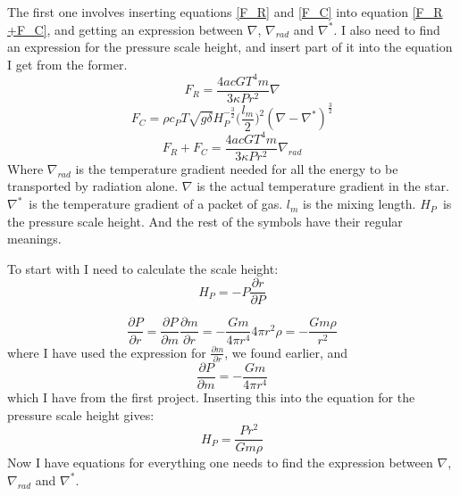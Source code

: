 \documentclass[a4paper,12pt]{article}
\begin{document}
The first one involves inserting equations \ref{F_R} and \ref{F_C} into equation \ref{F_R +F_C}, and getting an expression between $\nabla$, $\nabla_{rad}$ and $\nabla^*$. 
I also need to find an expression for the pressure scale height, and insert part of it into the equation I get from the former.
\begin{equation}
F_R = \frac{4acGT^4 m}{3\kappa Pr^2}\nabla
\label{F_R}
\end{equation}
\begin{equation}
 F_C = \rho c_P T \sqrt{g\delta}H_P^{-\frac{3}{2}}\bigg(\frac{l_m}{2}\bigg)^2(\nabla - \nabla^*)^{\frac{3}{2}}
 \label{F_C}
\end{equation}
\begin{equation}
 F_R + F_C = \frac{4acGT^4 m}{3\kappa Pr^2}\nabla_{rad}
 \label{F_R +F_C}
\end{equation}
Where $\nabla_{rad}$ is the temperature gradient needed for all the energy to be transported by radiation alone. 
$\nabla$ is the actual temperature gradient in the star.
$\nabla^*$ is the temperature gradient of a packet of gas.
$l_m$ is the mixing length.
$H_P$ is the pressure scale height.
And the rest of the symbols have their regular meanings.

To start with I need to calculate the scale height:
\begin{equation}
 H_P = -P \frac{\partial r}{\partial P}
\end{equation}

\begin{equation*}
 \frac{\partial P}{\partial r} = \frac{\partial P}{\partial m}\frac{\partial m}{\partial r} = -\frac{Gm}{4\pi r^4} 4\pi r^2 \rho = -\frac{Gm\rho}{r^2}
\end{equation*}
where I have used the expression for $\frac{\partial m}{\partial r}$, we found earlier, and
\begin{equation*}
 \frac{\partial P}{\partial m} = -\frac{Gm}{4\pi r^4}
\end{equation*}
which I have from the first project.
Inserting this into the equation for the pressure scale height gives:
\begin{equation}
 H_P = \frac{Pr^2}{Gm\rho}
\end{equation}
Now I have equations for everything one needs to find the expression between $\nabla$, $\nabla_{rad}$ and $\nabla^*$.
\end{document}
